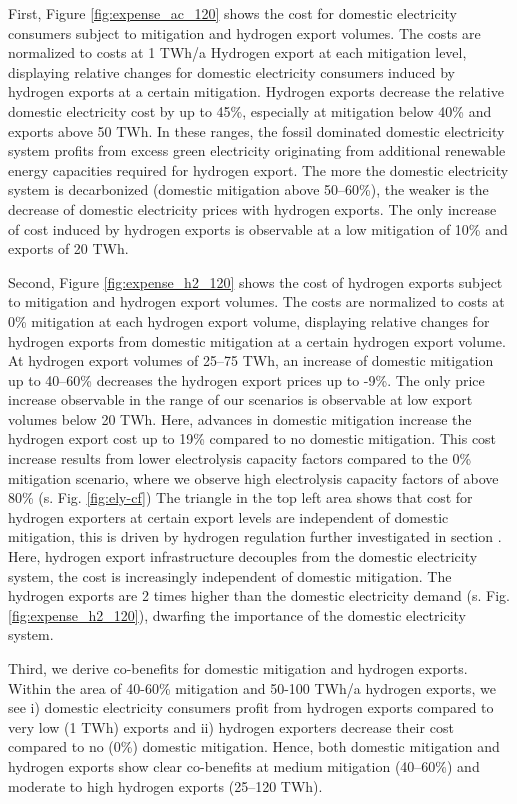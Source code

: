 First, Figure \ref{fig:expense_ac_120} shows the cost for domestic electricity consumers subject to mitigation and hydrogen export volumes. The costs are normalized to costs at 1 TWh/a Hydrogen export at each mitigation level, displaying relative changes for domestic electricity consumers induced by hydrogen exports at a certain mitigation.
Hydrogen exports decrease the relative domestic electricity cost by up to 45\%, especially at mitigation below 40\% and exports above 50 TWh. In these ranges, the fossil dominated domestic electricity system profits from excess green electricity originating from additional renewable energy capacities required for hydrogen export. The more the domestic electricity system is decarbonized (domestic mitigation above 50--60\%), the weaker is the decrease of domestic electricity prices with hydrogen exports.
The only increase of cost induced by hydrogen exports is observable at a low mitigation of 10\% and exports of 20 TWh. 

Second, Figure \ref{fig:expense_h2_120} shows the cost of hydrogen exports subject to mitigation and hydrogen export volumes. The costs are normalized to costs at 0\% mitigation at each hydrogen export volume, displaying relative changes for hydrogen exports from domestic mitigation at a certain hydrogen export volume.
At hydrogen export volumes of 25--75 TWh, an increase of domestic mitigation up to 40--60\% decreases the hydrogen export prices up to -9\%. 
The only price increase observable in the range of our scenarios is observable at low export volumes below 20 TWh. Here, advances in domestic mitigation increase the hydrogen export cost up to 19\% compared to no domestic mitigation.
This cost increase results from lower electrolysis capacity factors compared to the 0\% mitigation scenario, where we observe high electrolysis capacity factors of above 80\% (s. Fig. \ref{fig:ely-cf})
The triangle in the top left area shows that cost for hydrogen exporters at certain export levels are independent of domestic mitigation, this is driven by hydrogen regulation further investigated in section . Here, hydrogen export infrastructure decouples from the domestic electricity system, the cost is increasingly independent of domestic mitigation. The hydrogen exports are 2 times higher than the domestic electricity demand (s. Fig. \ref{fig:expense_h2_120}), dwarfing the importance of the domestic electricity system.


Third, we derive co-benefits for domestic mitigation and hydrogen exports. 
Within the area of 40-60\% mitigation and 50-100 TWh/a hydrogen exports, we see i) domestic electricity consumers profit from hydrogen exports compared to very low (1 TWh) exports and ii) hydrogen exporters decrease their cost compared to no (0\%) domestic mitigation. Hence, both domestic mitigation and hydrogen exports show clear co-benefits at medium mitigation (40--60\%) and moderate to high hydrogen exports (25--120 TWh). 


